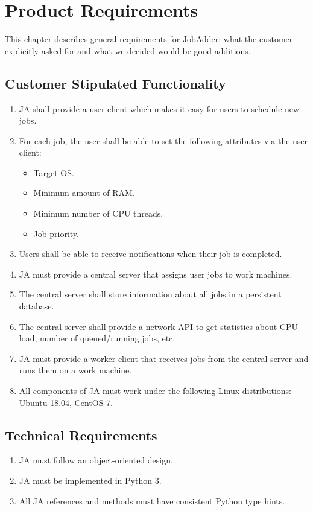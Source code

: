 \chapter{Product Requirements}
This chapter describes general requirements for JobAdder: what the customer explicitly asked for and what we decided would be good additions.
\section{Customer Stipulated Functionality}
\begin{enumerate}
  \item JA shall provide a user client which makes it easy for users to schedule new jobs.
  \item For each job, the user shall be able to set the following attributes via the user client:
    \begin{itemize}
      \item Target OS.
      \item Minimum amount of RAM.
      \item Minimum number of CPU threads.
      \item Job priority.
    \end{itemize}
  \item Users shall be able to receive notifications when their job is completed.
  \item JA must provide a central server that assigns user jobs to work machines.
  \item The central server shall store information about all jobs in a persistent database.
  \item The central server shall provide a network API to get statistics about CPU load, number of queued/running jobs, etc.
  \item JA must provide a worker client that receives jobs from the central server and runs them on a work machine.
  \item All components of JA must work under the following Linux distributions: Ubuntu 18.04, CentOS 7.
\end{enumerate}
\section{Technical Requirements}
\begin{enumerate}
  \item JA must follow an object-oriented design.
  \item JA must be implemented in Python 3.
  \item All JA references and methods must have consistent Python type hints.
\end{enumerate}
